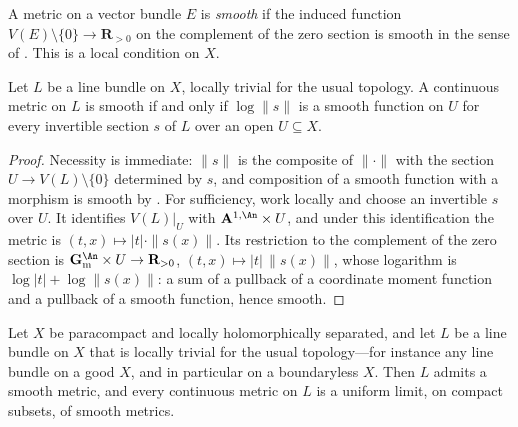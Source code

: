 \begin{definition}
\label{def:ch17-smooth-metric}
A metric on a vector bundle $E$ is \emph{smooth} if the induced function
$V(E)\setminus\{0\}\to\mathbf R_{>0}$ on the complement of the zero
section is smooth in the sense of .  This is a local
condition on $X$.
\end{definition}

\begin{proposition}
\label{prop:ch17-smooth-line}
Let $L$ be a line bundle on $X$, locally trivial for the usual topology.
A continuous metric on $L$ is smooth if and only if $\log\|s\|$ is a
smooth function on $U$ for every invertible section $s$ of $L$ over an
open $U\subseteq X$.
\end{proposition}

\begin{proof}
Necessity is immediate: $\|s\|$ is the composite of $\|\cdot\|$ with the
section $U\to V(L)\setminus\{0\}$ determined by $s$, and composition of
a smooth function with a morphism is smooth by
.  For sufficiency, work locally and choose an
invertible $s$ over $U$.  It identifies $V(L)|_U$ with
$\mathbf A^{1,\An}\times U$, and under this identification the metric is
$(t,x)\mapsto|t|\cdot\|s(x)\|$.  Its restriction to the complement of the
zero section is $\mathbf G_{\mathrm m}^{\An}\times U\to\mathbf R_{>0}$,
$(t,x)\mapsto|t|\,\|s(x)\|$, whose logarithm is
$\log|t|+\log\|s(x)\|$: a sum of a pullback of a coordinate moment
function and a pullback of a smooth function, hence smooth.
\end{proof}

\begin{proposition}
\label{prop:ch17-smooth-existence}
Let $X$ be paracompact and locally holomorphically separated, and let
$L$ be a line bundle on $X$ that is locally trivial for the usual
topology---for instance any line bundle on a good $X$, and in particular
on a boundaryless $X$.  Then $L$ admits a smooth metric, and every
continuous metric on $L$ is a uniform limit, on compact subsets, of smooth
metrics.
\end{proposition}

